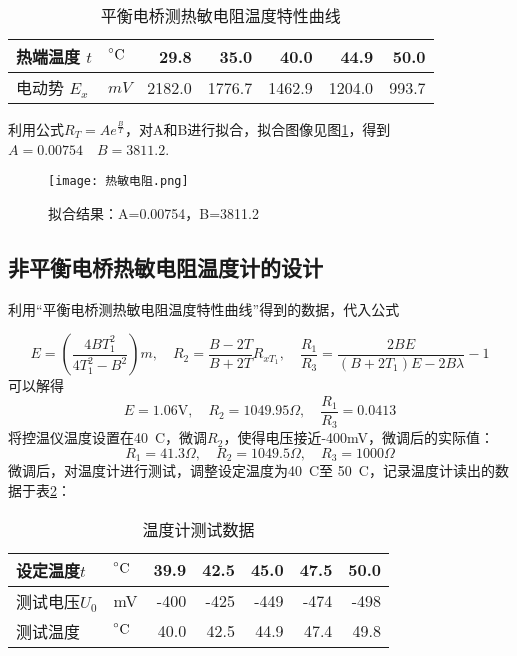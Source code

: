 \documentclass[11pt]{article}
\newcommand*{\mcelsius}{\unit{\prescript{\circ}{}C}}
\begin{document}
	\begin{table}[htbp]
		\centering
		\caption{平衡电桥测热敏电阻温度特性曲线}
		\begin{tabular}{|l|l|r|r|r|r|r|}
			\hline
			热端温度 $t$   & $\mcelsius$  & 29.8    &   35.0    & 40.0    & 44.9    & 50.0  \bigstrut\\
			\hline
			电动势 $E_x$   & $\unit{mV}$ & 2182.0   & 1776.7   & 1462.9   & 1204.0   & 993.7  \bigstrut\\
			\hline
		\end{tabular}%
		\label{tab:热敏电阻}%
	\end{table}%
	
	利用公式$R_T=A e^{\frac{B}{T}}$，对A和B进行拟合，拟合图像见图\ref{fig:热敏电阻}，得到$A=0.00754\quad B=3811.2$.
	\begin{figure}[htbp]
		\centering
		\texttt{[image: 热敏电阻.png]}
		\caption{拟合结果：A=0.00754，B=3811.2}
		\label{fig:热敏电阻}
	\end{figure}
	
	
	
	\subsection{非平衡电桥热敏电阻温度计的设计}
	利用“平衡电桥测热敏电阻温度特性曲线”得到的数据，代入公式
	
	\begin{displaymath}E=\left(\frac{4BT_1^2}{4T_1^2-B^2}\right)m,\quad R_2=\frac{B-2T}{B+2T}R_{xT_1},\quad \frac{R_1}{R_3}=\frac{2BE}{(B+2T_1)E-2B\lambda}-1\end{displaymath}
	可以解得
	\begin{equation*}
		E=1.06\mathrm{V},\quad R_2=1049.95\Omega,\quad  
		\frac{R_1}{R_3}=0.0413
	\end{equation*}
	将控温仪温度设置在40\mcelsius，微调$R_2$，使得电压接近-400mV，微调后的实际值：
	\begin{equation*}
		R_1=41.3\Omega,\quad R_2=1049.5\Omega,\quad  
		R_3=1000\Omega
	\end{equation*}
	微调后，对温度计进行测试，调整设定温度为40\mcelsius 至 50\mcelsius，记录温度计读出的数据于表\ref{tab:温度计}：
	\begin{table}[htbp]
		\centering
		\caption{温度计测试数据}
		\begin{tabular}{|l|l|r|r|r|r|r|}
			\hline
			设定温度$t$ & $\mcelsius$ & 39.9    & 42.5    & 45.0    & 47.5    & 50.0  \bigstrut\\
			\hline
			测试电压$U_0$ & mV      & -400  & -425  & -449  & -474  & -498  \bigstrut\\
			\hline
			测试温度    & $\mcelsius$ & 40.0    & 42.5    & 44.9    & 47.4    & 49.8  \bigstrut\\
			\hline
		\end{tabular}%
		\label{tab:温度计}%
	\end{table}%
	
\end{document}
